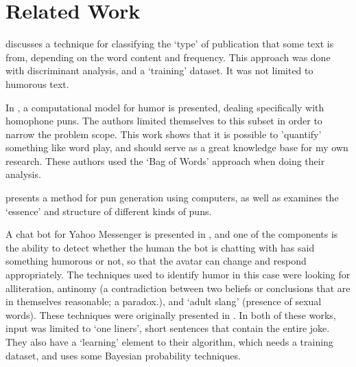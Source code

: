 \section{Related Work}

\cite{Stamatatos:2000:TGD:992730.992763} discusses a technique for classifying the `type' of publication that some text is from, depending on the word content and frequency. This approach was done with discriminant analysis, and a `training' dataset. It was not limited to humorous text.

In \cite{kaofunny}, a computational model for humor is presented, dealing specifically with homophone puns. The authors limited themselves to this subset in order to narrow the problem scope. This work shows that it is possible to 'quantify' something like word play, and should serve as a great knowledge base for my own research. These authors used the `Bag of Words' approach when doing their analysis.

\cite{ritchie2005computational} presents a method for pun generation using computers, as well as examines the `essence' and structure of different kinds of puns.

A chat bot for Yahoo Messenger is presented in \cite{humoristbot}, and one of the components is the ability to detect whether the human the bot is chatting with has said something humorous or not, so that the avatar can change and respond appropriately. The techniques used to identify humor in this case were looking for alliteration, antinomy (a contradiction between two beliefs or conclusions that are in themselves reasonable; a paradox.), and `adult slang' (presence of sexual words). These techniques were originally presented in \cite{COIN:COIN278}. In both of these works, input was limited to `one liners', short sentences that contain the entire joke. They also have a `learning' element to their algorithm, which needs a training dataset, and uses some Bayesian probability techniques.


